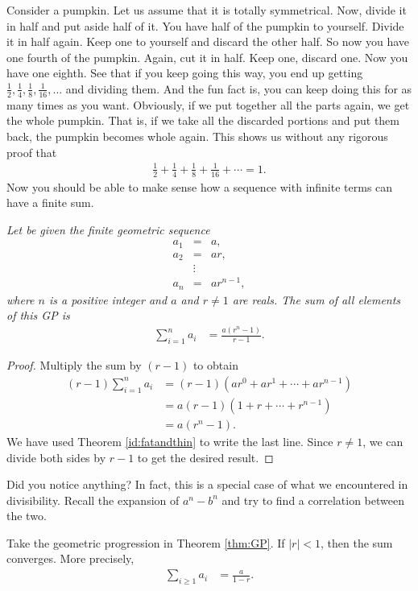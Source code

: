 \documentclass{subfile}
\begin{document}
	Consider a pumpkin. Let us assume that it is totally symmetrical. Now, divide it in half and put aside half of it. You have half of the pumpkin to yourself. Divide it in half again. Keep one to yourself and discard the other half. So now you have one fourth of the pumpkin. Again, cut it in half. Keep one, discard one. Now you have one eighth. See that if you keep going this way, you end up getting $\frac{1}{2},\frac{1}{4},\frac{1}{8},\frac{1}{16},\ldots$ and dividing them. And the fun fact is, you can keep doing this for as many times as you want. Obviously, if we put together all the parts again, we get the whole pumpkin. That is, if we take all the discarded portions and put them back, the pumpkin becomes whole again. This shows us without any rigorous proof that
		\begin{align*}
			\frac{1}{2}+\frac{1}{4}+\frac{1}{8}+\frac{1}{16}+\cdots=1.
		\end{align*}
	Now you should be able to make sense how a sequence with infinite terms can have a finite sum.
		\begin{theorem}\slshape\label{thm:GP}
			Let be given the finite geometric sequence
				\begin{eqnarray*}
					a_1 & = & a,\\
					a_2 & = & ar,\\
					& \vdots &\\
					a_n & = & ar^{n-1},
				\end{eqnarray*}
			where $n$ is a positive integer and $a$ and $r \neq 1$ are reals. The sum of all elements of this GP is
				\begin{align*}
					\sum_{i=1}^{n} a_i &= \frac{a \left(r^n-1\right)}{r-1}.
				\end{align*}
		\end{theorem}
		
		\begin{proof}
			Multiply the sum by $(r-1)$ to obtain
				\begin{align*}
					(r-1)\sum_{i=1}^{n} a_i &= (r-1)(ar^0 + ar^1 + \cdots + ar^{n-1})\\
											&= a(r-1)(1+r+ \cdots + r^{n-1})\\
											&= a(r^n -1).
				\end{align*}
			We have used Theorem \ref{id:fatandthin} to write the last line. Since $r \neq 1$, we can divide both sides by $r-1$ to get the desired result.
		\end{proof}
	Did you notice anything? In fact, this is a special case of what we encountered in divisibility. Recall the expansion of $a^n-b^n$ and try to find a correlation between the two.
		\begin{corollary}
			Take the geometric progression in Theorem \ref{thm:GP}. If $|r|<1$, then the sum converges. More precisely,
				\begin{align*}
					\sum_{i\geq1} a_i &= \frac{a}{1-r}.
				\end{align*}
		\end{corollary}
		
\end{document}
